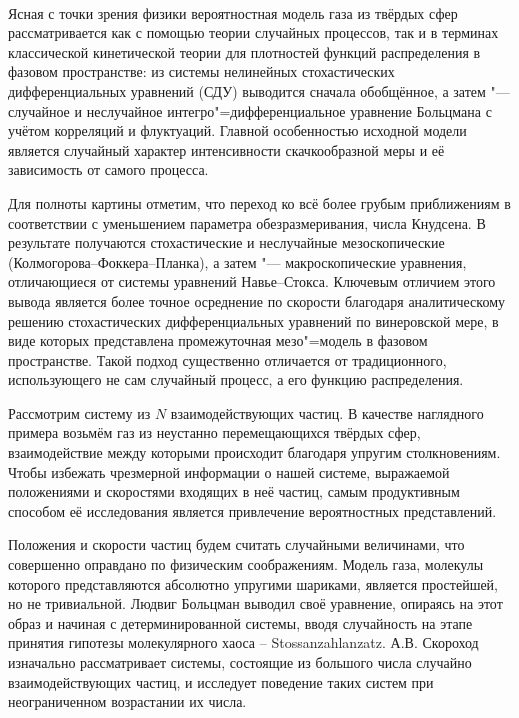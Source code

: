 \
\vzmscaption



Ясная с точки зрения физики вероятностная модель газа из твёрдых сфер рассматривается как с помощью теории случайных процессов, так и в терминах классической кинетической теории для плотностей функций распределения в фазовом пространстве: из системы нелинейных  стохастических дифференциальных уравнений (СДУ) выводится сначала обобщённое, а затем "--- случайное и неслучайное интегро"=дифференциальное уравнение Больцмана с учётом корреляций и флуктуаций. Главной особенностью исходной модели является случайный характер интенсивности скачкообразной меры и её зависимость от самого процесса.

Для полноты картины  отметим, что переход ко всё более грубым приближениям  в соответствии с уменьшением параметра обезразмеривания,  числа Кнудсена. В результате получаются стохастические и неслучайные мезоскопические (Колмогорова--Фоккера--Планка), а затем "--- макроскопические уравнения, отличающиеся от  системы уравнений Навье--Стокса. Ключевым отличием этого вывода является  более точное осреднение по скорости  благодаря  аналитическому решению стохастических дифференциальных уравнений по винеровской мере, в виде которых  представлена промежуточная мезо"=модель в фазовом пространстве. Такой подход существенно отличается от традиционного, использующего не сам случайный процесс, а его функцию распределения.

Рассмотрим систему из $N$ взаимодействующих частиц. В качестве наглядного примера возьмём газ из неустанно перемещающихся твёрдых сфер, взаимодействие между которыми происходит благодаря упругим столкновениям. Чтобы избежать чрезмерной информации  о нашей системе, выражаемой положениями и скоростями входящих в неё частиц, самым продуктивным способом её исследования является привлечение вероятностных представлений.


Положения и скорости частиц будем считать случайными величинами, что совершенно оправдано по  физическим соображениям.
Модель газа, молекулы которого представляются абсолютно упругими шариками, является простейшей, но не
тривиальной. Людвиг Больцман выводил своё
уравнение, опираясь на этот образ и начиная с детерминированной системы, вводя случайность на этапе принятия гипотезы молекулярного хаоса – \foreignlanguage{ngerman}{Stossanzahlanzatz}.
А.В. Скороход изначально рассматривает системы, состоящие из большого числа случайно взаимодействующих
частиц, и исследует поведение таких систем при неограниченном возрастании их числа.


